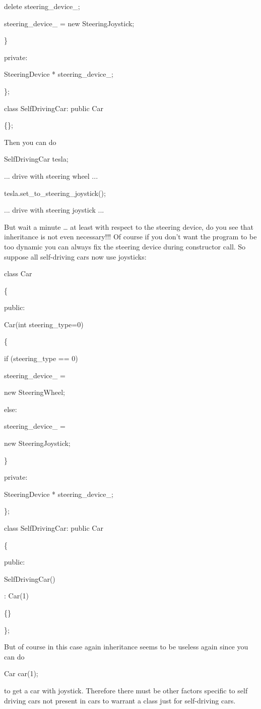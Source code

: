 \documentclass[
]{article}
\begin{document}
delete steering\_device\_;

steering\_device\_ = new SteeringJoystick;

\}

private:

SteeringDevice * steering\_device\_;

\};

class SelfDrivingCar: public Car

\{\};

Then you can do

SelfDrivingCar tesla;

... drive with steering wheel ...

tesla.set\_to\_steering\_joystick();

... drive with steering joystick ...

But wait a minute \ldots{} at least with respect to the steering device,
do you see that inheritance is not even necessary!!! Of course if you
don't want the program to be too dynamic you can always fix the steering
device during constructor call. So suppose all self-driving cars now use
joysticks:

class Car

\{

public:

Car(int steering\_type=0)

\{

if (steering\_type == 0)

steering\_device\_ =

new SteeringWheel;

else:

steering\_device\_ =

new SteeringJoystick;

\}

private:

SteeringDevice * steering\_device\_;

\};

class SelfDrivingCar: public Car

\{

public:

SelfDrivingCar()

: Car(1)

\{\}

\};

But of course in this case again inheritance seems to be useless again
since you can do

Car car(1);

to get a car with joystick. Therefore there must be other factors
specific to self driving cars not present in cars to warrant a class
just for self-driving cars.
\end{document}
